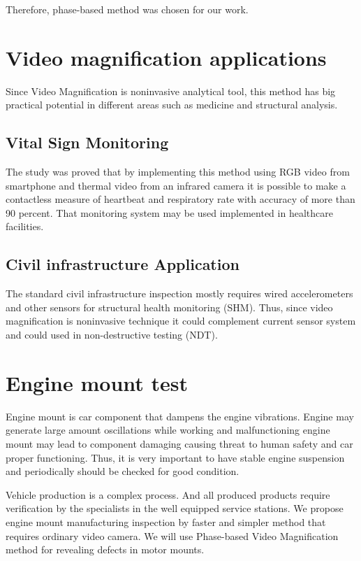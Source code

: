 \documentclass{IEEEtran}
\begin{document}
Therefore, phase-based method was chosen for our work.

\section{Video magnification applications}

Since Video Magnification is noninvasive analytical tool, this method has big practical potential in different areas such as medicine and structural analysis.

\subsection{Vital Sign Monitoring}

The study \cite{Aubakir2016VitalSM} was proved that by implementing this method using RGB video from smartphone and thermal video from an infrared camera it is possible to make a contactless measure of heartbeat and respiratory rate with accuracy of more than 90 percent. That monitoring system may be used implemented in healthcare facilities.

\subsection{Civil infrastructure Application}

The standard civil infrastructure inspection mostly requires wired accelerometers and other sensors for structural health monitoring (SHM). Thus, since video magnification is noninvasive technique it could complement current sensor system and could used in non-destructive testing (NDT).

\section{Engine mount test}

Engine mount is car component that dampens the engine vibrations. Engine may generate large amount oscillations while working and malfunctioning engine mount may lead to component damaging causing threat to human safety and car proper functioning. Thus, it is very important to have stable engine suspension and periodically should be checked for good condition.

Vehicle production is a complex process. And all produced products require verification by the specialists in the well equipped service stations. We propose engine mount manufacturing inspection by faster and simpler method that requires ordinary video camera. We will use Phase-based Video Magnification method for revealing defects in motor mounts. 
\end{document}
